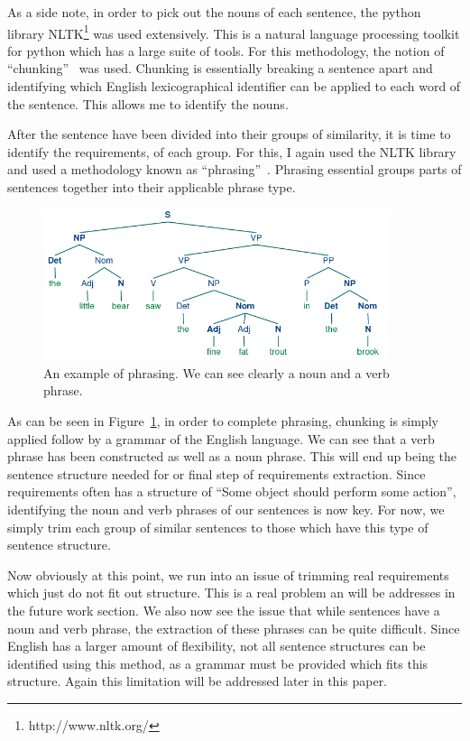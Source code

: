 \documentclass[conference]{IEEEtran}
\begin{document}
As a side note, in order to pick out the nouns of each sentence, the python library NLTK\footnote{http://www.nltk.org/}
was used extensively.
This is a natural language processing toolkit for python which has a large suite of tools. For this methodology,
the notion of ``chunking''~\cite{Collobert:2011:NLP} was used. Chunking is essentially breaking a sentence apart and identifying which English
lexicographical identifier can be applied to each word of the sentence. This allows me to identify the nouns.

After the sentence have been divided into their groups of similarity, it is time to identify the requirements,
of each group. For this, I again used the NLTK library and used a methodology known as
``phrasing''~\cite{Collobert:2011:NLP}. Phrasing
essential groups parts of sentences together into their applicable phrase type.

\begin{figure}[tb!]
\centering
\includegraphics[width=0.9\textwidth]{images/phrase}
\caption{An example of phrasing. We can see clearly a noun and a verb phrase.\label{fig:phrase}}
\end{figure}

As can be seen in Figure~\ref{fig:phrase}, in order to complete phrasing, chunking is simply applied
follow by a grammar of the English language. We can see that a verb phrase has been constructed as well
as a noun phrase. This will end up being the sentence structure needed for or final step of requirements
extraction. Since requirements often has a structure of ``Some object should perform some action'', identifying
the noun and verb phrases of our sentences is now key. For now, we simply trim each group of similar sentences
to those which have this type of sentence structure.

Now obviously at this point, we run into an issue of trimming real requirements which just do not fit out structure.
This is a real problem an will be addresses in the future work section. We also now see the issue that while sentences
have a noun and verb phrase, the extraction of these phrases can be quite difficult. Since English has
a larger amount of flexibility, not all sentence structures can be identified using this method, as a grammar must
be provided which fits this structure. Again this limitation will be addressed later in this paper.
\end{document}
